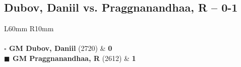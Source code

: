 \documentclass[../main.tex]{subfiles}
\begin{document}
\subsection{Dubov, Daniil vs. Praggnanandhaa, R -- 0-1}

\begin{multicols*}{2}

\begin{tabular}{L{60mm} R{10mm}}
\\ 
\\[3mm]
\textbf{$\square$ \hspace{2mm}  GM Dubov, Daniil} (2720)  & \textbf{0}\\ 
\textbf{$\blacksquare$ \hspace{2mm}  GM Praggnanandhaa, R} (2612)  & \textbf{1}\\ 
\end{tabular}

\end{multicols*}
\newpage
\end{document}
